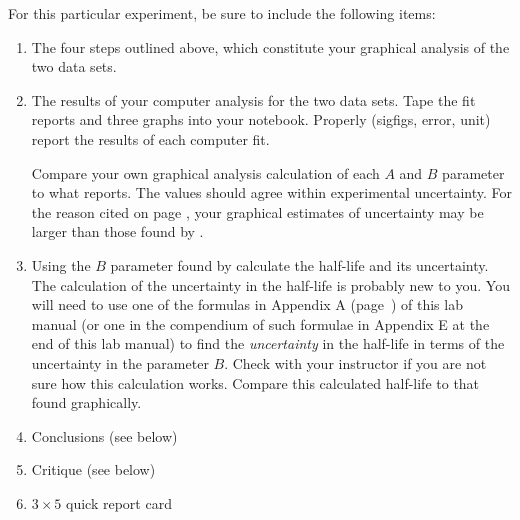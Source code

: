 For this particular experiment, be sure to include the following items:
\begin{enumerate}
\item The four steps outlined above, which constitute your graphical
analysis of the two data sets.
\item The results of your computer analysis for the two data sets.
Tape the fit reports and three graphs into your notebook.  Properly
(sigfigs, error, unit) report the results of each computer fit.

Compare your own graphical analysis calculation of each
$A$ and $B$ parameter to what \WAPP reports.  The 
values should agree within experimental uncertainty.
For the reason cited on page \pageref{par:small.error}, your graphical
estimates of uncertainty may be larger than those found by \WAPP.

\item Using the $B$ parameter found by \WAPP calculate the half-life and its
uncertainty. The calculation of the uncertainty in the
half-life is probably new to you.  You will need to use one
of the formulas in Appendix A
(page~\pageref{errorprop}) of this lab manual (or one in the compendium
of such formulae in Appendix E at the end of this lab manual) to find the
{\em uncertainty} in the half-life in terms of the
uncertainty in the parameter $B$.  
Check with your instructor if you are not
sure how this calculation works.  Compare this calculated
half-life to that found graphically.

\item Conclusions (see below)
\item Critique (see below)
\item $3\times5$ quick report card
\end{enumerate}

